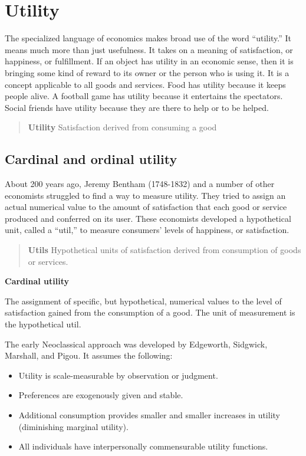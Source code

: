 \documentclass[11pt,]{book}
\providecommand{\tightlist}{%
  \setlength{\itemsep}{0pt}\setlength{\parskip}{0pt}}
\theoremstyle{definition}
\theoremstyle{definition}
\theoremstyle{definition}
\theoremstyle{remark}
\begin{document}
\section{Utility}\label{utility}

The specialized language of economics makes broad use of the word
``utility.'' It means much more than just usefulness. It takes on a
meaning of satisfaction, or happiness, or fulfillment. If an object has
utility in an economic sense, then it is bringing some kind of reward to
its owner or the person who is using it. It is a concept applicable to
all goods and services. Food has utility because it keeps people alive.
A football game has utility because it entertains the spectators. Social
friends have utility because they are there to help or to be helped.

\begin{quote}
\textbf{Utility} \newline Satisfaction derived from consuming a good
\end{quote}

\subsection{Cardinal and ordinal
utility}\label{cardinal-and-ordinal-utility}

About 200 years ago, Jeremy Bentham (1748-1832) and a number of other
economists struggled to find a way to measure utility. They tried to
assign an actual numerical value to the amount of satisfaction that each
good or service produced and conferred on its user. These economists
developed a hypothetical unit, called a ``util,'' to measure consumers'
levels of happiness, or satisfaction.

\begin{quote}
\textbf{Utils} \newline Hypothetical units of satisfaction derived from
consumption of goods or services.
\end{quote}

\textbf{Cardinal utility}

The assignment of specific, but hypothetical, numerical values to the
level of satisfaction gained from the consumption of a good. The unit of
measurement is the hypothetical util.

The early Neoclassical approach was developed by Edgeworth, Sidgwick,
Marshall, and Pigou. It assumes the following:

\begin{itemize}
\tightlist
\item
  Utility is scale-measurable by observation or judgment.
\item
  Preferences are exogenously given and stable.
\item
  Additional consumption provides smaller and smaller increases in
  utility (diminishing marginal utility).
\item
  All individuals have interpersonally commensurable utility functions.
\end{itemize}
\end{document}
